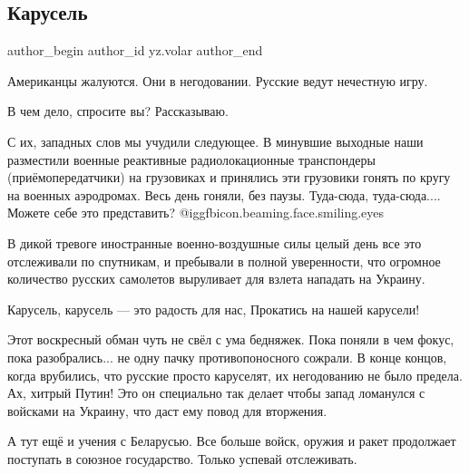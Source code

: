 
 
 
 
 
 
\subsection{Карусель}
\label{sec:28_01_2022.yz.volar.1.karusel}
 
\ifcmt
 author_begin
   author_id yz.volar
 author_end
\fi

Американцы жалуются. Они в негодовании. Русские ведут нечестную игру.

В чем дело, спросите вы? Рассказываю.

С их, западных слов мы учудили следующее. В минувшие выходные наши разместили
военные реактивные радиолокационные транспондеры (приёмопередатчики) на
грузовиках и принялись эти грузовики гонять по кругу на военных аэродромах.
Весь день гоняли, без паузы. Туда-сюда, туда-сюда.... Можете себе это
представить? @igg{fbicon.beaming.face.smiling.eyes} 


В дикой тревоге иностранные военно-воздушные силы целый день все это
отслеживали по спутникам, и пребывали в полной уверенности, что огромное
количество русских самолетов выруливает для взлета нападать на Украину.

\begin{zznagolos}
Карусель, карусель — это радость для нас, Прокатись на нашей карусели!	
\end{zznagolos}

Этот воскресный обман чуть не свёл с ума бедняжек. Пока поняли в чем фокус,
пока разобрались... не одну пачку противопоносного сожрали. В конце концов,
когда врубились, что русские просто каруселят, их негодованию не было предела.
Ах, хитрый Путин! Это он специально так делает чтобы запад ломанулся с войсками
на Украину, что даст ему повод для вторжения.

А тут ещё и учения с Беларусью. Все больше войск, оружия и ракет продолжает
поступать в союзное государство. Только успевай отслеживать.


